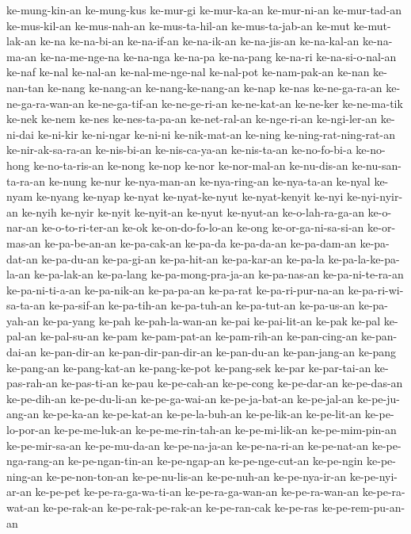 {ke-mung-kin-an ke-mung-kus ke-mur-gi ke-mur-ka-an ke-mur-ni-an
ke-mur-tad-an ke-mus-kil-an ke-mus-nah-an ke-mus-ta-hil-an
ke-mus-ta-jab-an ke-mut ke-mut-lak-an ke-na ke-na-bi-an ke-na-if-an
ke-na-ik-an ke-na-jis-an ke-na-kal-an ke-na-ma-an ke-na-me-nge-na
ke-na-nga ke-na-pa ke-na-pang ke-na-ri ke-na-si-o-nal-an ke-naf ke-nal
ke-nal-an ke-nal-me-nge-nal ke-nal-pot ke-nam-pak-an ke-nan ke-nan-tan
ke-nang ke-nang-an ke-nang-ke-nang-an ke-nap ke-nas ke-ne-ga-ra-an
ke-ne-ga-ra-wan-an ke-ne-ga-tif-an ke-ne-ge-ri-an ke-ne-kat-an ke-ne-ker
ke-ne-ma-tik ke-nek ke-nem ke-nes ke-nes-ta-pa-an ke-net-ral-an
ke-nge-ri-an ke-ngi-ler-an ke-ni-dai ke-ni-kir ke-ni-ngar ke-ni-ni
ke-nik-mat-an ke-ning ke-ning-rat-ning-rat-an ke-nir-ak-sa-ra-an
ke-nis-bi-an ke-nis-ca-ya-an ke-nis-ta-an ke-no-fo-bi-a ke-no-hong
ke-no-ta-ris-an ke-nong ke-nop ke-nor ke-nor-mal-an ke-nu-dis-an
ke-nu-san-ta-ra-an ke-nung ke-nur ke-nya-man-an ke-nya-ring-an
ke-nya-ta-an ke-nyal ke-nyam ke-nyang ke-nyap ke-nyat ke-nyat-ke-nyut
ke-nyat-kenyit ke-nyi ke-nyi-nyir-an ke-nyih ke-nyir ke-nyit ke-nyit-an
ke-nyut ke-nyut-an ke-o-lah-ra-ga-an ke-o-nar-an ke-o-to-ri-ter-an ke-ok
ke-on-do-fo-lo-an ke-ong ke-or-ga-ni-sa-si-an ke-or-mas-an ke-pa-be-an-an
ke-pa-cak-an ke-pa-da ke-pa-da-an ke-pa-dam-an ke-pa-dat-an ke-pa-du-an
ke-pa-gi-an ke-pa-hit-an ke-pa-kar-an ke-pa-la ke-pa-la-ke-pa-la-an
ke-pa-lak-an ke-pa-lang ke-pa-mong-pra-ja-an ke-pa-nas-an
ke-pa-ni-te-ra-an ke-pa-ni-ti-a-an ke-pa-nik-an ke-pa-pa-an ke-pa-rat
ke-pa-ri-pur-na-an ke-pa-ri-wi-sa-ta-an ke-pa-sif-an ke-pa-tih-an
ke-pa-tuh-an ke-pa-tut-an ke-pa-us-an ke-pa-yah-an ke-pa-yang ke-pah
ke-pah-la-wan-an ke-pai ke-pai-lit-an ke-pak ke-pal ke-pal-an ke-pal-su-an
ke-pam ke-pam-pat-an ke-pam-rih-an ke-pan-cing-an ke-pan-dai-an
ke-pan-dir-an ke-pan-dir-pan-dir-an ke-pan-du-an ke-pan-jang-an ke-pang
ke-pang-an ke-pang-kat-an ke-pang-ke-pot ke-pang-sek ke-par ke-par-tai-an
ke-pas-rah-an ke-pas-ti-an ke-pau ke-pe-cah-an ke-pe-cong ke-pe-dar-an
ke-pe-das-an ke-pe-dih-an ke-pe-du-li-an ke-pe-ga-wai-an ke-pe-ja-bat-an
ke-pe-jal-an ke-pe-ju-ang-an ke-pe-ka-an ke-pe-kat-an ke-pe-la-buh-an
ke-pe-lik-an ke-pe-lit-an ke-pe-lo-por-an ke-pe-me-luk-an
ke-pe-me-rin-tah-an ke-pe-mi-lik-an ke-pe-mim-pin-an ke-pe-mir-sa-an
ke-pe-mu-da-an ke-pe-na-ja-an ke-pe-na-ri-an ke-pe-nat-an
ke-pe-nga-rang-an ke-pe-ngan-tin-an ke-pe-ngap-an ke-pe-nge-cut-an
ke-pe-ngin ke-pe-ning-an ke-pe-non-ton-an ke-pe-nu-lis-an ke-pe-nuh-an
ke-pe-nya-ir-an ke-pe-nyi-ar-an ke-pe-pet ke-pe-ra-ga-wa-ti-an
ke-pe-ra-ga-wan-an ke-pe-ra-wan-an ke-pe-ra-wat-an ke-pe-rak-an
ke-pe-rak-pe-rak-an ke-pe-ran-cak ke-pe-ras ke-pe-rem-pu-an-an
}
